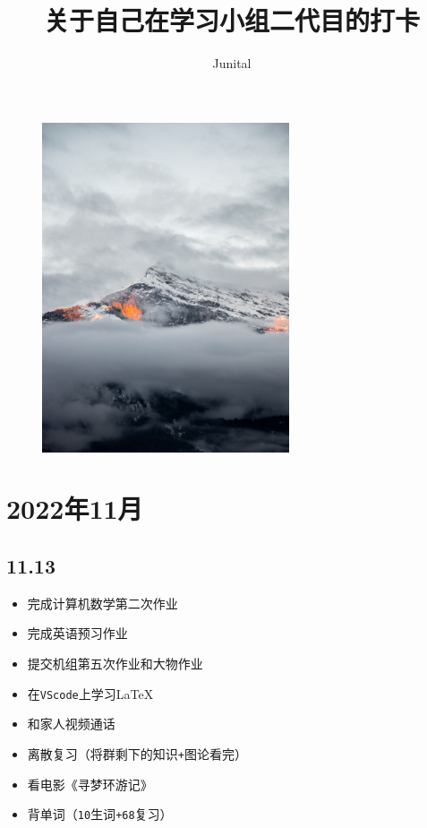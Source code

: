 \documentclass[UTF8]{ctexart}
\title{关于自己在学习小组二代目的打卡}
\author{Junital}
\begin{document}
\date{}
\maketitle
\begin{figure}[ht]
    \centering
    \includegraphics[width=0.65\textwidth]{./Figures/nicolas-savignat-wU5sBkxKtXs-unsplash.jpg}
    \nonumber
\end{figure}
\newpage
\section*{2022年11月}
\subsection*{11.13}
\begin{itemize}
    \item 完成计算机数学第二次作业
    \item 完成英语预习作业
    \item 提交机组第五次作业和大物作业
    \item 在\verb|VScode|上学习\LaTeX
    \item 和家人视频通话
    \item 离散复习（将群剩下的知识\verb|+|图论看完）
    \item 看电影《寻梦环游记》
    \item 背单词（\verb|10|生词\verb|+68|复习）
\end{itemize}
\end{document}
